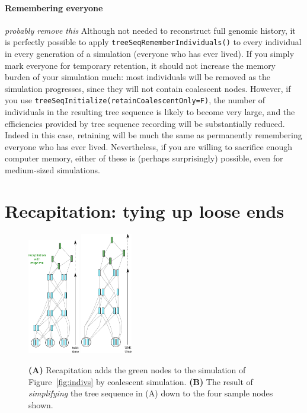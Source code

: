 \documentclass[12pt]{article}
\newcommand{\comment}[1]{\textit{\color{green} #1}}
\begin{document}
\paragraph{Remembering everyone}
\comment{probably remove this}
Although not needed to reconstruct full genomic history,
it is perfectly possible to apply \verb|treeSeqRememberIndividuals()| to every individual
in every generation of a simulation (everyone who has ever lived).
If you simply mark everyone for temporary retention,
it should not increase the memory burden of your simulation much:
most individuals will be removed as the simulation progresses,
since they will not contain coalescent nodes.
However, if you use \verb|treeSeqInitialize(retainCoalescentOnly=F)|,
the number of individuals in the resulting tree sequence is likely to become very large,
and the efficiencies provided by tree sequence recording will be substantially reduced.
Indeed in this case,
retaining will be much the same as permanently remembering everyone who has ever lived.
Nevertheless, if you are willing to sacrifice enough computer memory,
either of these is (perhaps surprisingly) possible, even for medium-sized simulations.


\section{Recapitation: tying up loose ends}

\begin{figure}
\centering
    \includegraphics[width=0.2\textwidth]{figures/pedigree_recapitate.pdf}
    \includegraphics[width=0.2\textwidth]{figures/pedigree_simplify.pdf}
\caption{
    \textbf{(A)} Recapitation adds the green nodes 
    to the simulation of Figure~\ref{fig:indivs} by coalescent simulation.
    \textbf{(B)} The result of \emph{simplifying} the tree sequence in (A)
    down to the four sample nodes shown.
}
\label{fig:recap_simp}
\end{figure}
\end{document}
